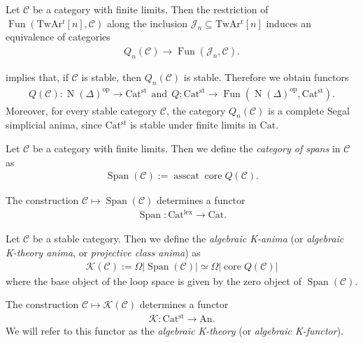 \documentclass[a4paper,dvipdfmx,11pt,reqno]{amsart}
\DeclareMathOperator{\myop}{op}
\DeclareMathOperator{\N}{N}
\DeclareMathOperator{\Fun}{Fun}
\DeclareMathOperator{\core}{core}
\DeclareMathOperator{\asscat}{asscat}
\DeclareMathOperator{\Span}{Span}
\newcommand{\C}{\mathcal{C}}
\newcommand{\J}{\mathcal{J}}
\newcommand{\K}{\mathcal{K}}
\newcommand{\An}{\mathrm{An}}
\newcommand{\Cat}{\mathrm{Cat}}
\newcommand{\Catlex}{\mathrm{Cat^{lex}}}
\newcommand{\Catst}{\mathrm{Cat^{st}}}
\newcommand{\TwArr}{\mathrm{TwAr^{r}}}
\begin{document}
\begin{lemma} \label{lem.Q_nC_is_equivalent_to_FunJ_n_C}
  Let $\C$ be a category with finite limits.
  Then the restriction of $\Fun(\TwArr[n],\C)$ along the inclusion $\J_n \subseteq \TwArr[n]$ induces an equivalence of categories
  \begin{align*}
    Q_n(\C) \to \Fun(\J_n,\C).
  \end{align*} 
\end{lemma}

\begin{remark}
   implies that, if $\C$ is stable, then $Q_n(\C)$ is stable.
  Therefore we obtain functors
  \begin{align*}
    Q(\C) : \N(\Delta)^{\myop} \to \Catst ~~ \text{and} ~~ Q : \Catst \to \Fun(\N(\Delta)^{\myop},\Catst).
  \end{align*}
  Moreover, for every stable category $\C$, the category $Q_n(\C)$ is a complete Segal simplicial anima, since $\Catst$ is stable under finite limits in $\Cat$.
\end{remark}

\begin{definition}
  Let $\C$ be a category with finite limits.
  Then we define the \textit{category of spans} in $\C$ as 
  \begin{align*}
    \Span(\C) := \asscat \core Q(\C).
  \end{align*}

  The construction $\C \mapsto \Span(\C)$ determines a functor 
  \begin{align*}
    \Span : \Catlex \to \Cat.
  \end{align*}
\end{definition}

\begin{definition} \label{def.algebraic_k-anima_using_Q}
  Let $\C$ be a stable category.
  Then we define the \textit{algebraic K-anima} (or \textit{algebraic K-theory anima}, or \textit{projective class anima}) as 
  \begin{align*}
    \K(\C) := \Omega|\Span(\C)| \simeq \Omega|\core Q(\C)|
  \end{align*}
  where the base object of the loop space is given by the zero object of $\Span(\C)$.

  The construction $\C \mapsto \K(\C)$ determines a functor 
  \begin{align*}
    \K : \Catst \to \An. 
  \end{align*}
  We will refer to this functor as the \textit{algebraic K-theory} (or \textit{algebraic K-functor}).
\end{definition}
\end{document}
